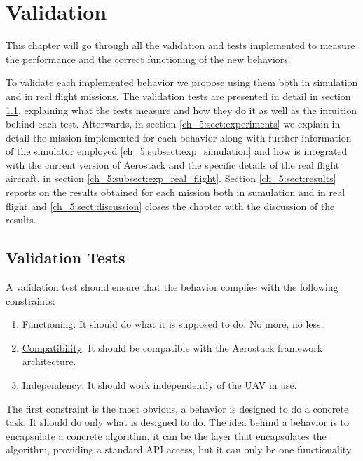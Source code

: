 \chapter{Validation}

  This chapter will go through all the validation and tests implemented to measure the performance and the correct functioning of the new behaviors. 

  To validate each implemented behavior we propose using them both in simulation and in real flight missions. The validation tests are presented in detail in section \ref{ch_5:sect:val_tests}, explaining what the tests measure and how they do it as well as the intuition behind each test. Afterwards, in section \ref{ch_5:sect:experiments} we explain in detail the mission implemented for each behavior along with further information of the simulator employed \ref{ch_5:subsect:exp_simulation} and how is integrated with the current version of Aerostack and the specific details of the real flight aircraft, in section \ref{ch_5:subsect:exp_real_flight}. Section \ref{ch_5:sect:results} reports on the results obtained for each mission both in sumulation and in real flight and \ref{ch_5:sect:discussion} closes the chapter with the discussion of the results.
 
\section{Validation Tests} \label{ch_5:sect:val_tests}

  A validation test should ensure that the behavior complies with the following constraints:

  \begin{enumerate}
    \item \underline{Functioning}: It should do what it is supposed to do. No more, no less.
    \item \underline{Compatibility}: It should be compatible with the Aerostack framework architecture.
    \item \underline{Independency}: It should work independently of the UAV in use.
  \end{enumerate}

  The first constraint is the most obvious, a behavior is designed to do a concrete task. It should do only what is designed to do. The idea behind a behavior is to encapsulate a concrete algorithm, it can be the layer that encapsulates the algorithm, providing a standard API access, but it can only be one functionality.

